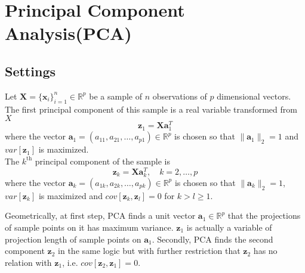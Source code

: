 \documentclass[../main.tex]{subfiles}
\begin{document}
    \section{Principal Component Analysis(PCA)}
        \subsection{Settings}
            Let $\mathbf{X} = \{\mathbf{x}_i\}_{i=1}^n\in\mathbb{R}^p$ be a sample of $n$ observations of $p$ dimensional vectors. The first principal component of this sample is a real variable transformed from $X$
            \[
                \mathbf{z}_1 = \mathbf{X}\mathbf{a}_1^T
            \]
            where the vector $\mathbf{a}_1=(a_{11}, a_{21},\dots,a_{p1})\in\mathbb{R}^p$ is chosen so that $\|\mathbf{a}_1\|_2=1$ and $var[\mathbf{z}_1]$ is maximized.\\
            The $k^{\mathrm{th}}$ principal component of the sample is
            \[
                \mathbf{z}_k = \mathbf{X}\mathbf{a}_k^T,\quad k=2,\dots,p
            \]
            where the vector $\mathbf{a}_k=(a_{1k},a_{2k},\dots,a_{pk})\in\mathbb{R}^p$ is chosen so that $\|\mathbf{a}_k\|_2=1$, $var[\mathbf{z}_k]$ is maximized and $cov[\mathbf{z}_k,\mathbf{z}_l]=0$ for $k>l\geq1$.
            
            Geometrically, at first step, PCA finds a unit vector $\mathbf{a}_1\in\mathbb{R}^p$ that the projections of sample points on it has maximum variance. $\mathbf{z}_1$ is actually a variable of projection length of sample points on $\mathbf{a}_1$. Secondly, PCA finds the second component $\textbf{z}_2$ in the same logic but with further restriction that $\mathbf{z}_2$ has no relation with $\mathbf{z}_1$, i.e. $cov[\mathbf{z}_2,\mathbf{z}_1]=0$.
        
\end{document}

